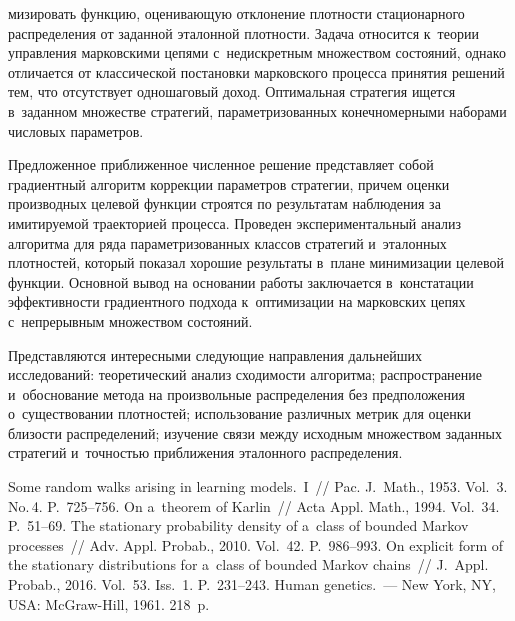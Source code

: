 \begin{multicols}{2}

\noindent
мизировать функцию, оценивающую отклонение 
плотности стационарного распределения от заданной эталонной плот\-ности. 
Задача относится к~теории управ\-ле\-ния марковскими цепями с~недискретным 
множеством со\-сто\-яний, однако отличается от классической постановки 
марковского процесса принятия решений тем, что отсутствует одношаговый 
доход. Оптимальная стратегия ищется в~заданном множестве стратегий, 
параметризованных конечномерными наборами чис\-ло\-вых па\-ра\-мет\-ров. 

Предложенное при\-бли\-жен\-ное чис\-лен\-ное решение пред\-став\-ля\-ет собой 
градиентный алгоритм коррекции па\-ра\-мет\-ров стратегии, причем оценки\linebreak 
производных целевой функции строятся по результатам наблюдения за 
имитируемой траекторией процесса. Проведен экспериментальный анализ 
алгоритма для ряда па\-ра\-мет\-ри\-зо\-ван\-ных классов стратегий и~эталонных 
плотностей, который показал хорошие результаты в~плане минимизации 
целевой функции. Основной вывод на основании работы за\-клю\-ча\-ет\-ся 
в~констатации эффективности градиентного подхода к~оптимизации на 
марковских цепях с~непрерывным множеством со\-сто\-яний. 

Пред\-став\-ля\-ют\-ся 
интересными сле\-ду\-ющие на\-прав\-ле\-ния дальнейших исследований:
теоретический анализ сходимости алгоритма;
распространение и~обоснование метода на произвольные\linebreak 
распределения без предположения о~существовании плотностей;
  использование различных мет\-рик для оценки бли\-зости 
распределений;
  изучение связи между исходным множеством заданных стратегий 
и~точ\-ностью при\-бли\-же\-ния эталонного распределения.
  
{\small\frenchspacing
 {%
 \begin{thebibliography}{99}
   Some random walks arising in learning models.~I~// 
  Pac. J.~Math., 1953. 
Vol.~3. No.\,4. P.~725--756.
   On a~theorem of Karlin~// Acta Appl. Math., 1994. Vol.~34. P.~51--69.
   The stationary probability density of a~class of bounded Markov 
processes~// Adv. Appl. Probab., 2010. Vol.~42. P.~986--993.
   On explicit form of the stationary distributions for a~class of 
bounded Markov chains~// J.~Appl. Probab., 2016. Vol.~53. Iss.~1. P.~231--243. 
   Human genetics.~--- New York, NY, USA: McGraw-Hill, 1961. 218~p.
 

\end{thebibliography}}}
\end{multicols}
